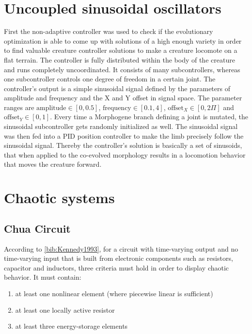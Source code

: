 \documentclass[main]{subfiles}
\begin{document}
\section{Uncoupled sinusoidal oscillators}

First the non-adaptive controller was used to check if the evolutionary optimization is able to come up with solutions of a high enough variety in order to find valuable creature controller solutions to make a creature locomote on a flat terrain. The controller is fully distributed within the body of the creature and runs completely uncoordinated. It consists of many subcontrollers, whereas one subcontroller controls one degree of freedom in a certain joint. The controller's output is a simple sinusoidal signal defined by the parameters of amplitude and frequency and the X and Y offset in signal space. The parameter ranges are $\text{amplitude} \in [0,0.5]$, $\text{frequency} \in [0.1,4]$, $\text{offset}_X \in [0,2\Pi]$ and $\text{offset}_Y \in [0,1]$. Every time a Morphogene branch defining a joint is mutated, the sinusoidal subcontroller gets randomly initialized as well. The sinusoidal signal was then fed into a PID position controller to make the limb precisely follow the sinusoidal signal. Thereby the controller's solution is basically a set of sinusoids, that when applied to the co-evolved morphology results in a locomotion behavior that moves the creature forward. 

\section{Chaotic systems}

\lipsum[2]

\subsection{Chua Circuit}

According to \ref{bib:Kennedy1993}, for a circuit with time-varying output and no time-varying input that is built from electronic components such as resistors, capacitor and inductors, three criteria must hold in order to display chaotic behavior. It must contain:
  \begin{enumerate}
  \item at least one nonlinear element (where piecewise linear is sufficient)
  \item at least one locally active resistor
  \item at least three energy-storage elements
  \end{enumerate}
  
\end{document}
